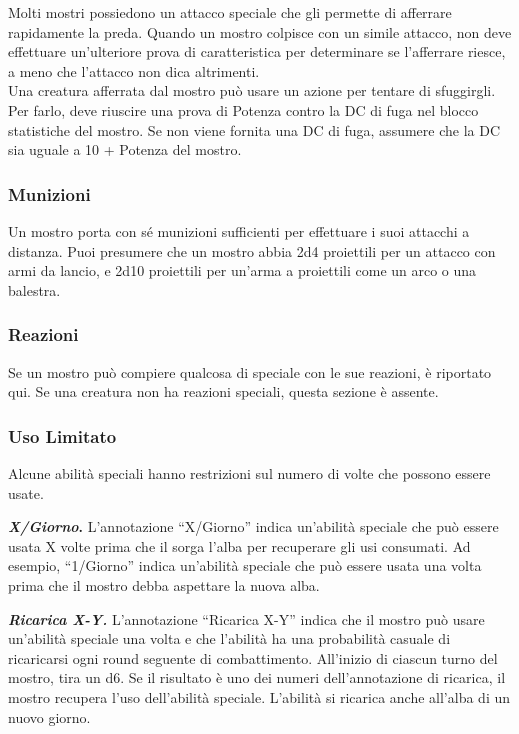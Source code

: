 Molti mostri possiedono un attacco speciale che gli permette di afferrare rapidamente la preda. Quando un mostro colpisce con un simile attacco, non deve effettuare un'ulteriore prova di caratteristica per determinare se l'afferrare riesce, a meno che l'attacco non dica altrimenti.\\
Una creatura afferrata dal mostro può usare un azione per tentare di sfuggirgli. Per farlo, deve riuscire una prova di Potenza contro la DC di fuga nel blocco statistiche del
mostro. Se non viene fornita una DC di fuga, assumere che la DC sia uguale a 10 + Potenza del mostro.

\subsubsection{Munizioni}

Un mostro porta con sé munizioni sufficienti per effettuare i suoi attacchi a distanza. Puoi presumere che un mostro abbia 2d4 proiettili per un attacco con armi da lancio, e 2d10 proiettili per un'arma a proiettili come un arco o una balestra.

\subsubsection{Reazioni}

Se un mostro può compiere qualcosa di speciale con le sue reazioni, è riportato qui. Se una creatura non ha reazioni speciali, questa sezione è assente.

\subsubsection{Uso Limitato}

Alcune abilità speciali hanno restrizioni sul numero di volte che
possono essere usate.

\textbf{\emph{X/Giorno}.} L'annotazione ``X/Giorno'' indica un'abilità speciale che può essere usata X volte prima che il sorga l'alba per recuperare gli usi consumati. Ad esempio, ``1/Giorno'' indica un'abilità speciale che può essere usata una volta prima che il mostro debba aspettare la nuova alba.

\emph{\textbf{Ricarica X-Y.}} L'annotazione ``Ricarica X-Y'' indica che il mostro può usare un'abilità speciale una volta e che l'abilità ha una probabilità casuale di ricaricarsi ogni round seguente di combattimento. All'inizio di ciascun turno del mostro, tira un d6. Se il risultato è uno dei numeri dell'annotazione di ricarica, il mostro recupera l'uso dell'abilità speciale. L'abilità si ricarica anche all'alba di un nuovo giorno.

